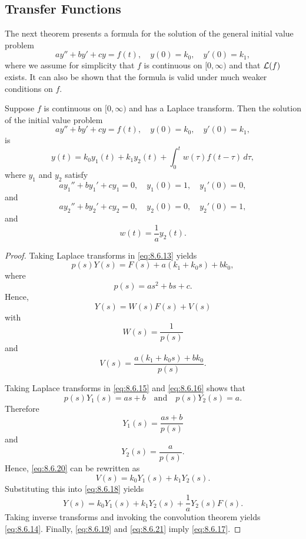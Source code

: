 \documentclass{ximera}
\begin{document}
\subsection*{Transfer Functions}

The next theorem presents a formula for the solution of
the general initial value problem
$$
ay''+by'+cy=f(t),\quad y(0)=k_0,\quad y'(0)=k_1,
$$
where we assume for simplicity that $f$ is continuous on $[0,\infty)$
and that ${\cal L}(f)$ exists. 
It can also be shown that the formula is valid under much weaker conditions on $f$.

\begin{theorem}\label{thmtype:8.6.3}
Suppose $f$ is continuous on $[0,\infty)$ and has a Laplace
transform$.$ Then the solution of the initial value problem
\begin{equation}\label{eq:8.6.13}
ay''+by'+cy=f(t),\quad y(0)=k_0,\quad y'(0)=k_1,
\end{equation}
is
\begin{equation}\label{eq:8.6.14}
y(t)=k_0y_1(t)+k_1y_2(t)+\int_0^tw(\tau)f(t-\tau)\,d\tau,
\end{equation}
where $y_1$  and $y_2$  satisfy
\begin{equation}\label{eq:8.6.15}
ay_1''+by_1'+cy_1=0,\quad y_1(0)=1,\quad y_1'(0)=0,
\end{equation}
and
\begin{equation}\label{eq:8.6.16}
ay_2''+by_2'+cy_2=0,\quad y_2(0)=0,\quad y_2'(0)=1,
\end{equation}
and
\begin{equation}\label{eq:8.6.17}
w(t)=\frac{1}{a}y_2(t).
\end{equation}
\end{theorem}

\begin{proof}
  Taking Laplace transforms in   \eqref{eq:8.6.13} yields
 $$
p(s)Y(s)=F(s)+a(k_1+k_0s)+bk_0,
$$
where
$$
p(s)=as^2+bs+c.
$$
Hence,
\begin{equation}\label{eq:8.6.18}
Y(s)=W(s)F(s)+V(s)
\end{equation}
with
\begin{equation}\label{eq:8.6.19}
W(s)=\frac{1}{p(s)}
\end{equation}
and
\begin{equation}\label{eq:8.6.20}
V(s)=\frac{a(k_1+k_0s)+bk_0}{p(s)}.
\end{equation}

Taking Laplace transforms in  \eqref{eq:8.6.15} and  \eqref{eq:8.6.16} shows that
$$
p(s)Y_1(s)=as+b\quad\mbox{and}\quad p(s)Y_2(s)=a.
$$
Therefore
$$
Y_1(s)=\frac{as+b}{p(s)}
$$
and
\begin{equation}\label{eq:8.6.21}
 Y_2(s)=\frac{a}{p(s)}.
\end{equation}
Hence,  \eqref{eq:8.6.20} can be rewritten as
$$
V(s)=k_0Y_1(s)+k_1Y_2(s).
$$
Substituting this into \eqref{eq:8.6.18} yields
$$
Y(s)=k_0Y_1(s)+k_1Y_2(s)+\frac{1}{a}Y_2(s)F(s).
$$
Taking inverse transforms and invoking the convolution theorem yields
 \eqref{eq:8.6.14}. Finally,   \eqref{eq:8.6.19} and  \eqref{eq:8.6.21}
imply  \eqref{eq:8.6.17}.
\end{proof}
\end{document}
